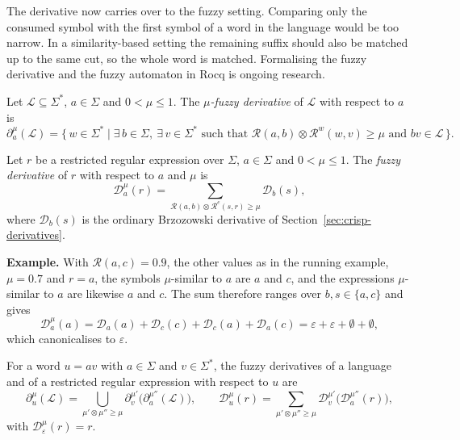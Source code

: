The derivative now carries over to the fuzzy setting. Comparing only the consumed
symbol with the first symbol of a word in the language would be too narrow. In a
similarity-based setting the remaining suffix should also be matched up to the same
cut, so the whole word is matched. Formalising the fuzzy derivative and the fuzzy
automaton in Rocq is ongoing research.

\begin{definition}\label{def:fuzzy-deriv-lang}
Let $\mathcal{L}\subseteq\Sigma^{*}$, $a\in\Sigma$ and $0<\mu\le1$. The
\emph{$\mu$-fuzzy derivative} of $\mathcal{L}$ with respect to $a$ is
\[
\partial_a^{\mu}(\mathcal{L})
= \{\,w\in\Sigma^{*} \mid \exists\, b\in\Sigma,\ \exists\, v\in\Sigma^{*}
   \text{ such that } \mathcal{R}(a,b)\otimes\mathcal{R}^{w}(w,v)\ge\mu
   \text{ and } bv\in\mathcal{L}\,\}.
\]
\end{definition}

\begin{definition}\label{def:fuzzy-deriv-expr}
Let $r$ be a restricted regular expression over $\Sigma$, $a\in\Sigma$ and
$0<\mu\le1$. The \emph{fuzzy derivative} of $r$ with respect to $a$ and $\mu$ is
\[
\mathcal{D}_a^{\mu}(r)
= \sum_{\mathcal{R}(a,b)\otimes\mathcal{R}^{e}(s,r)\ge\mu} \mathcal{D}_b(s),
\]
where $\mathcal{D}_b(s)$ is the ordinary Brzozowski derivative of
Section~\ref{sec:crisp-derivatives}.
\end{definition}

\noindent\textbf{Example.} With $\mathcal{R}(a,c)=0.9$, the other values as in the
running example, $\mu=0.7$ and $r=a$, the symbols $\mu$-similar to $a$ are $a$ and
$c$, and the expressions $\mu$-similar to $a$ are likewise $a$ and $c$. The sum
therefore ranges over $b,s\in\{a,c\}$ and gives
\[
\mathcal{D}_a^{\mu}(a)
= \mathcal{D}_a(a)+\mathcal{D}_c(c)+\mathcal{D}_c(a)+\mathcal{D}_a(c)
= \varepsilon+\varepsilon+\emptyset+\emptyset,
\]
which canonicalises to $\varepsilon$.

\begin{definition}\label{def:fuzzy-word-deriv}
For a word $u=av$ with $a\in\Sigma$ and $v\in\Sigma^{*}$, the fuzzy derivatives of a
language and of a restricted regular expression with respect to $u$ are
\[
\partial_u^{\mu}(\mathcal{L})
= \bigcup_{\mu'\otimes\mu''\ge\mu}\partial_v^{\mu'}\bigl(\partial_a^{\mu''}(\mathcal{L})\bigr),
\qquad
\mathcal{D}_u^{\mu}(r)
= \sum_{\mu'\otimes\mu''\ge\mu}\mathcal{D}_v^{\mu'}\bigl(\mathcal{D}_a^{\mu''}(r)\bigr),
\]
with $\mathcal{D}_\varepsilon^{\mu}(r)=r$.
\end{definition}


